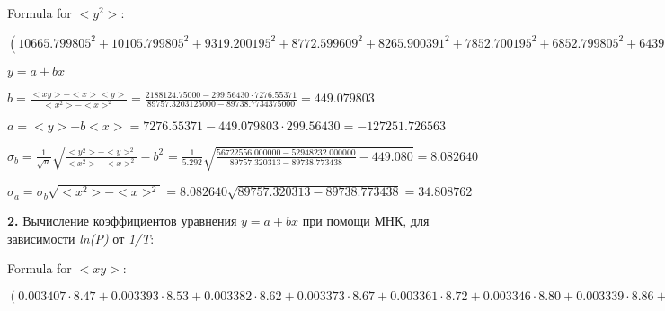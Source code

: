 \documentclass[12pt,a4paper]{article}
\begin{document}
Formula for $<y^2>:$

$(10665.799805^2 + 10105.799805^2 + 9319.200195^2 + 8772.599609^2 + 8265.900391^2 + 7852.700195^2 + 6852.799805^2 + 6439.500000^2 + 6132.799805^2 + 5652.899902^2 + 5319.600098^2 + 5020.000000^2 + 4679.600098^2 + 4259.600098^2 + 4772.899902^2 + 5039.600098^2 + 5546.200195^2 + 5799.500000^2 + 6132.799805^2 + 6612.799805^2 + 7039.399902^2 + 7532.700195^2 + 7986.000000^2 + 8479.299805^2 + 9052.599609^2 + 9465.900391^2 + 10132.500000^2 + 10812.500000^2) / 28$

\vspace{0,5cm}

$y = a + bx$
\vspace{0,5cm}

$b = \frac{<xy> - <x><y>}{<x^2> - <x>^2} = \frac{2188124.75000 - 299.56430 \cdot 7276.55371}{89757.3203125000 - 89738.7734375000} = 449.079803$
\vspace{0,5cm}

$a =<y> - b<x> = 7276.55371 - 449.079803 \cdot 299.56430 = -127251.726563$
\vspace{0,5cm}

$\sigma_b = \frac{1}{\sqrt{n}} \sqrt { \frac{<y^2> - <y>^2}{<x^2> - <x>^2}  - b^2} = \frac{1}{5.292} \sqrt {\frac{56722556.000000 - 52948232.000000}{89757.320313 - 89738.773438} - 449.080} = 8.082640$
\vspace{0,5cm}

$\sigma_a = \sigma_b \sqrt{<x^2> - <x>^2} = 8.082640 \sqrt{89757.320313 - 89738.773438} = 34.808762$

\vspace{1cm}

\textbf{2.} Вычисление коэффициентов уравнения $y = a + bx$ при помощи МНК, для зависимости \textit{ln(P)} от \textit{1/T}:

\vspace{0,5cm}

Formula for $<xy>:$

$(0.003407 \cdot 8.47 + 0.003393 \cdot 8.53 + 0.003382 \cdot 8.62 + 0.003373 \cdot 8.67 + 0.003361 \cdot 8.72 + 0.003346 \cdot 8.80 + 0.003339 \cdot 8.86 + 0.003328 \cdot 8.93 + 0.003317 \cdot 8.99 + 0.003306 \cdot 9.05 + 0.003295 \cdot 9.11 + 0.003284 \cdot 9.16 + 0.003273 \cdot 9.22 + 0.003261 \cdot 9.29 + 0.003260 \cdot 9.27 + 0.003275 \cdot 9.22 + 0.003288 \cdot 9.14 + 0.003299 \cdot 9.08 + 0.003310 \cdot 9.02 + 0.003321 \cdot 8.97 + 0.003346 \cdot 8.83 + 0.003355 \cdot 8.77 + 0.003366 \cdot 8.72 + 0.003377 \cdot 8.64 + 0.003389 \cdot 8.58 + 0.003400 \cdot 8.52 + 0.003412 \cdot 8.45 + 0.003423 \cdot 8.36) / 28$
\end{document}
